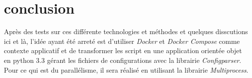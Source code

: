 \section{conclusion}
Après des tests sur ces différente technologies et méthodes et quelques disscutions ici et là, l'idée ayant été arreté est d'utiliser \emph{Docker} et \emph{Docker Compose} comme contexte applicatif et de transformer les script en une application orientée objet en python 3.3 gérant les fichiers de configurations avec la librairie \emph{Configparser}. Pour ce qui est du parallélisme, il sera réalisé en utilisant la librairie \emph{Multiprocess}.
















